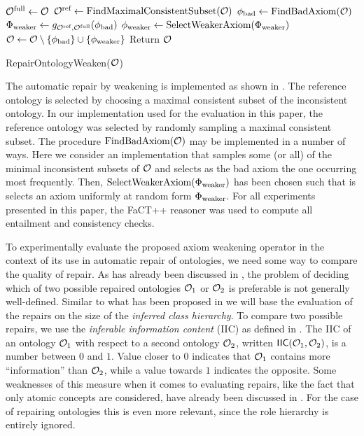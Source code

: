 \documentclass[
]{ceurart}
\begin{document}
\begin{algorithm}[t]
  \begin{algorithmic}
    \State ${\mathcal{O}^\textnormal{full}} \gets \mathcal{O}$
    \State ${\mathcal{O}^\textnormal{ref}} \gets \textnormal{FindMaximalConsistentSubset(\ensuremath{\mathcal{O}})}$
      \State $\phi_\textnormal{bad} \gets \textnormal{FindBadAxiom}(\mathcal{O})$
      \State $\Phi_\textnormal{weaker} \gets g_{{\mathcal{O}^\textnormal{ref}},{\mathcal{O}^\textnormal{full}}}(\phi_\textnormal{bad})$
      \State $\phi_\textnormal{weaker} \gets \textnormal{SelectWeakerAxiom}(\Phi_\textnormal{weaker})$
      \State $\mathcal{O} \gets \mathcal{O} \setminus \{\phi_\textnormal{bad}\} \cup \{\phi_\textnormal{weaker}\}$
    \EndWhile
    \State Return $\mathcal{O}$
  \end{algorithmic}
  \caption{RepairOntologyWeaken($\mathcal{O}$)}
	\label{algo:repair-weaken}
\end{algorithm}

The automatic repair by weakening is implemented as shown in . The reference ontology is selected by choosing a maximal consistent subset of the inconsistent ontology. In our implementation used for the evaluation in this paper, the reference ontology was selected by randomly sampling a maximal consistent subset. The procedure $\textnormal{FindBadAxiom}(\mathcal{O})$ may be implemented in a number of ways. Here we consider an implementation that samples some (or all) of the minimal inconsistent subsets of $\mathcal{O}$ and selects as the bad axiom the one occurring most frequently. Then, $\textnormal{SelectWeakerAxiom}(\Phi_\textnormal{weaker})$ has been chosen such that is selects an axiom uniformly at random form $\Phi_\textnormal{weaker}$. For all experiments presented in this paper, the FaCT++ reasoner \cite{tsarkov2006fact++} was used to compute all entailment and consistency checks.

To experimentally evaluate the proposed axiom weakening operator in the context of its use in automatic repair of ontologies, we need some way to compare the quality of repair. As has already been discussed in \cite{troquard2018repairing}, the problem of deciding which of two possible repaired ontologies $\mathcal{O}_1$ or $\mathcal{O}_2$ is preferable is not generally well-defined. Similar to what has been proposed in \cite{troquard2018repairing} we will base the evaluation of the repairs on the size of the \emph{inferred class hierarchy}. To compare two possible repairs, we use the \emph{inferable information content} (IIC) as defined in \cite{troquard2018repairing}. The IIC  of an ontology $\mathcal{O}_1$ with respect to a second ontology $\mathcal{O}_2$, written ${\mathsf{IIC}}(\mathcal{O}_1, \mathcal{O}_2)$, is a number between $0$ and $1$. Value closer to $0$ indicates that $\mathcal{O}_1$ contains more “information” than $\mathcal{O}_2$, while a value towards $1$ indicates the opposite. Some weaknesses of this measure when it comes to evaluating repairs, like the fact that only atomic concepts are considered, have already been discussed in \cite{troquard2018repairing}. For the case of repairing \SROIQ ontologies this is even more relevant, since the role hierarchy is entirely ignored.
\end{document}
